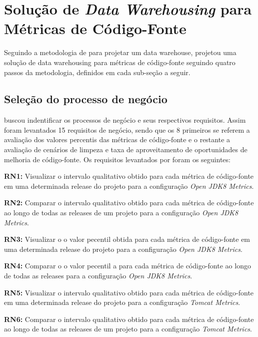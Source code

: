 \section{Solução de \textit{Data Warehousing} para Métricas de Código-Fonte}



Seguindo a metodologia de  para projetar um data warehouse,  projetou uma solução de data warehousing para métricas de código-fonte seguindo quatro passos da metodologia, definidos em cada sub-seção a seguir.


\subsection{Seleção do processo de negócio}

 buscou indentificar os processos de negócio e seus respectivos requisitos. Assim foram levantados 15 requisitos de negócio, sendo que os 8 primeiros se referem a avaliação dos valores percentis das métricas de código-fonte e o restante a avaliação de cenários de limpeza e taxa de aproveitamento de oportunidades de melhoria de código-fonte. Os requisitos levantados por  foram os seguintes:

\textbf{RN1:}  Visualizar o intervalo qualitativo obtido para cada métrica de código-fonte em uma determinada release do projeto para a configuração \textit{Open JDK8 Metrics}.

\textbf{RN2:}  Comparar o intervalo qualitativo obtido para cada métrica de código-fonte ao longo de todas as releases de um projeto para a configuração \textit{Open JDK8 Metrics}.

\textbf{RN3:}  Visualizar o o valor pecentil obtida para cada métrica de código-fonte em uma determinada release do projeto para a configuração  \textit{Open JDK8 Metrics}.

\textbf{RN4:}  Comparar o o valor pecentil a para cada métrica de código-fonte ao longo de todas as releases para a configuração \textit{Open JDK8 Metrics}.

\textbf{RN5:}  Visualizar o intervalo qualitativo obtido para cada métrica de código-fonte em uma determinada release do projeto para a configuração \textit{Tomcat Metrics}.

\textbf{RN6:}  Comparar o intervalo qualitativo obtido para cada métrica de código-fonte ao longo de todas as releases de um projeto para a configuração \textit{Tomcat Metrics}.

